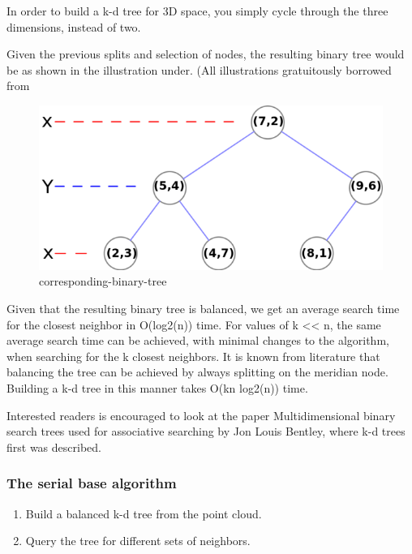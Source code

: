 In order to build a k-d tree for 3D space, you simply cycle through the three dimensions, instead of two.

Given the previous splits and selection of nodes, the resulting binary tree would be as shown in the illustration under. (All illustrations gratuitously borrowed from 

\begin{figure}[ht!]
\centering
\includegraphics[width=120mm]{../gfx/Tree_0001.png}

\caption{corresponding-binary-tree}
\label{fig:tree_0001}
\end{figure}

Given that the resulting binary tree is balanced, we get an average search time for the closest neighbor in O(log2(n)) time. For values of k << n, the same average search time can be achieved, with minimal changes to the algorithm, when searching for the k closest neighbors. It is known from literature that balancing the tree can be achieved by always splitting on the meridian node. Building a k-d tree in this manner takes O(kn log2(n)) time.

Interested readers is encouraged to look at the paper Multidimensional binary search trees used for associative searching by Jon Louis Bentley, where k-d trees first was described.





\subsubsection{The serial base algorithm} %
\label{ssub:the_serial_base_algorithm}

\begin{enumerate}
    \item Build a balanced k-d tree from the point cloud.
    \item Query the tree for different sets of neighbors.
\end{enumerate}

